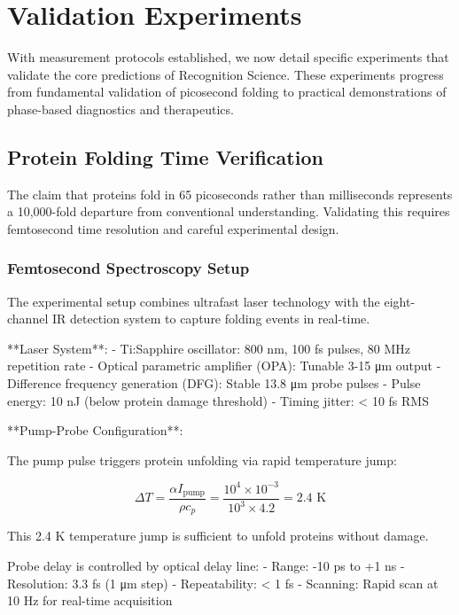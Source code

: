 \documentclass[12pt,a4paper]{report}
\begin{document}
\chapter{Validation Experiments}

With measurement protocols established, we now detail specific experiments that validate the core predictions of Recognition Science. These experiments progress from fundamental validation of picosecond folding to practical demonstrations of phase-based diagnostics and therapeutics.

\section{Protein Folding Time Verification}

The claim that proteins fold in 65 picoseconds rather than milliseconds represents a 10,000-fold departure from conventional understanding. Validating this requires femtosecond time resolution and careful experimental design.

\subsection{Femtosecond Spectroscopy Setup}

The experimental setup combines ultrafast laser technology with the eight-channel IR detection system to capture folding events in real-time.

**Laser System**:
- Ti:Sapphire oscillator: 800 nm, 100 fs pulses, 80 MHz repetition rate
- Optical parametric amplifier (OPA): Tunable 3-15 μm output
- Difference frequency generation (DFG): Stable 13.8 μm probe pulses
- Pulse energy: 10 nJ (below protein damage threshold)
- Timing jitter: < 10 fs RMS

**Pump-Probe Configuration**:

The pump pulse triggers protein unfolding via rapid temperature jump:

\begin{equation}
\Delta T = \frac{\alpha I_{\text{pump}}}{\rho c_p} = \frac{10^4 \times 10^{-3}}{10^3 \times 4.2} = 2.4 \text{ K}
\end{equation}

This 2.4 K temperature jump is sufficient to unfold proteins without damage.

Probe delay is controlled by optical delay line:
- Range: -10 ps to +1 ns
- Resolution: 3.3 fs (1 μm step)
- Repeatability: < 1 fs
- Scanning: Rapid scan at 10 Hz for real-time acquisition
\end{document}
